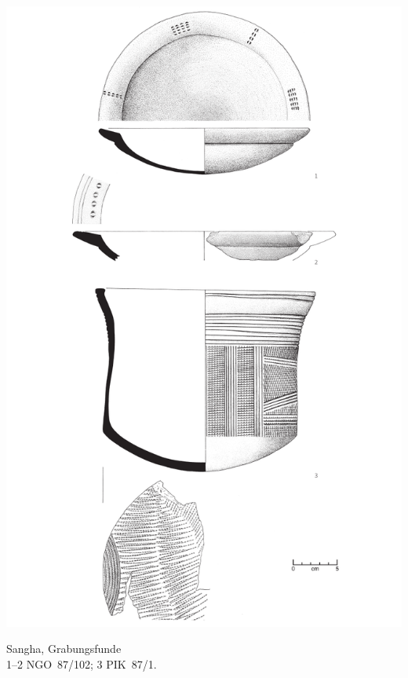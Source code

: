 \begin{pl}[H]
	\includegraphics{plt/Taf44.pdf}
	\vspace{.75em}\caption{\mbox{Sangha}, Grabungsfunde \\ 1--2 NGO~87/102; 3 PIK~87/1.}
	\label{pl:44}
\end{pl}

